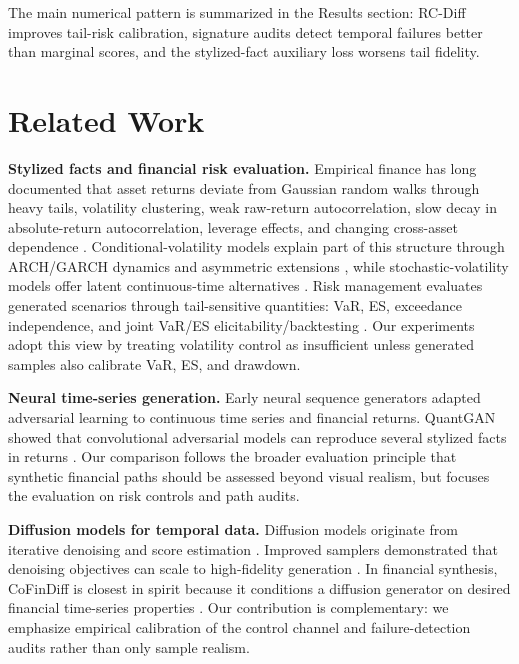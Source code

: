 \documentclass[letterpaper]{article}
\begin{document}
The main numerical pattern is summarized in the Results section: RC-Diff improves tail-risk calibration, signature audits detect temporal failures better than marginal scores, and the stylized-fact auxiliary loss worsens tail fidelity.

\section{Related Work}
\textbf{Stylized facts and financial risk evaluation.} Empirical finance has long documented that asset returns deviate from Gaussian random walks through heavy tails, volatility clustering, weak raw-return autocorrelation, slow decay in absolute-return autocorrelation, leverage effects, and changing cross-asset dependence \citep{mandelbrot1963variation,ding1993long,engle1993measuring,cont2001stylized}. Conditional-volatility models explain part of this structure through ARCH/GARCH dynamics and asymmetric extensions \citep{engle1982arch,bollerslev1986garch,nelson1991egarch,glosten1993relation}, while stochastic-volatility models offer latent continuous-time alternatives \citep{heston1993closed}. Risk management evaluates generated scenarios through tail-sensitive quantities: VaR, ES, exceedance independence, and joint VaR/ES elicitability/backtesting \citep{artzner1999coherent,kupiec1995techniques,christoffersen1998evaluating,acerbi2002expected,fissler2016higher,nolde2017elicitability}. Our experiments adopt this view by treating volatility control as insufficient unless generated samples also calibrate VaR, ES, and drawdown.

\textbf{Neural time-series generation.} Early neural sequence generators adapted adversarial learning to continuous time series and financial returns. QuantGAN showed that convolutional adversarial models can reproduce several stylized facts in returns \citep{wiese2020quant}. Our comparison follows the broader evaluation principle that synthetic financial paths should be assessed beyond visual realism, but focuses the evaluation on risk controls and path audits.

\textbf{Diffusion models for temporal data.} Diffusion models originate from iterative denoising and score estimation \citep{sohldickstein2015deep,ho2020ddpm,song2021score}. Improved samplers demonstrated that denoising objectives can scale to high-fidelity generation \citep{nichol2021improved}. In financial synthesis, CoFinDiff is closest in spirit because it conditions a diffusion generator on desired financial time-series properties \citep{tanaka2025cofindiff}. Our contribution is complementary: we emphasize empirical calibration of the control channel and failure-detection audits rather than only sample realism.
\end{document}
